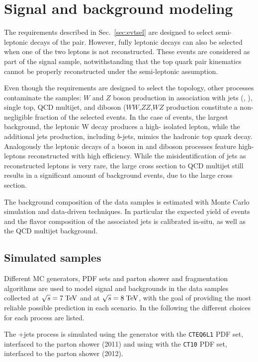 \section{Signal and background modeling}
\label{sec:bckgmodel}

The requirements described in Sec.~\ref{sec:evtsel} are designed to
select semi-leptonic decays of the \ttbar{} pair. However, fully
leptonic decays can also be selected when one of the two leptons is not
reconstructed. These events are considered as part of the signal
sample, notwithstanding that the top quark pair kinematics cannot be
properly reconstructed under the semi-leptonic assumption.

Even though the requirements are designed to select the \ttbar{}
topology, other processes contaminate the samples: $W$ and $Z$ boson
production in association with jets (\wjets{}, \zjets{}), single top,
QCD multijet, and diboson ($WW$,$ZZ$,$WZ$ production constitute a
non-negligible fraction of the selected events.
In the case of \wjets{} events, the largest background, the leptonic W
decay produces a high-\pt{} isolated lepton, while the additional jets
production, including $b$-jets, mimics the hadronic top quark decay.
Analogously the leptonic decays of a boson in \zjets{} and diboson
processes feature high-\pt{} leptons reconstructed with high
efficiency.
While the misidentification of jets as reconstructed leptons is very
rare, the large cross section to QCD multijet still results in a
significant amount of background events, due to the large cross
section.

The background composition of the data samples is estimated with Monte
Carlo simulation and data-driven techniques. In particular the
expected yield of \wjets{} events and the flavor composition of the
associated jets is calibrated in-situ, as well as the QCD
multijet background.

\subsection{Simulated samples}
\label{sec:mcsamples}

Different MC generators, PDF sets and parton shower and fragmentation
algorithms are used to model signal and backgrounds in the data
samples collected at $\sqrt{s} = 7 \; \mathrm{TeV}{}$ and at $\sqrt{s} = 8
\; \mathrm{TeV}{}$, with the goal of providing the most reliable possible
prediction in each scenario. In the following the different choices
for each process are listed.

The \ttbar{}+jets process is simulated using the \alpgen{} generator
with the {\tt CTEQ6L1} PDF set, interfaced to the 
\herwig{} parton shower (2011) and using \powheg{} with the {\tt CT10}
PDF set, interfaced to the \pythia{} parton shower
(2012).

